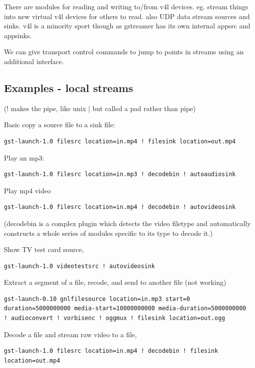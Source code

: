 \documentclass[oneside,english]{scrbook}
\begin{document}
There are modules for reading and writing to/from v4l devices. eg. stream things
into new virtual v4l devices for others to read. also UDP data stream
sources and sinks. v4l is a minority sport though as gstreamer has
its own internal appsrc and appsinks.

We can give transport control commands to jump to points in streams using an additional interface.

\subsection{Examples - local streams}

(\textquotedbl{}!\textquotedbl{} makes the pipe, like unix \textquotedbl{}|\textquotedbl{}
but called a \textquotedbl{}pad\textquotedbl{} rather than \textquotedbl{}pipe\textquotedbl{})

Basic copy a source file to a sink file: 

\begin{lstlisting}
gst-launch-1.0 filesrc location=in.mp4 ! filesink location=out.mp4
\end{lstlisting}

Play an mp3:

\begin{lstlisting}
gst-launch-1.0 filesrc location=in.mp3 ! decodebin ! autoaudiosink
\end{lstlisting}

Play mp4 video 
\begin{lstlisting}
gst-launch-1.0 filesrc location=in.mp4 ! decodebin ! autovideosink
\end{lstlisting}
(decodebin is a complex plugin which detects the video filetype and automatically constructs a whole series of modules specific to its type to decode it.)

Show TV test card source,
\begin{lstlisting}
gst-launch-1.0 videotestsrc ! autovideosink
\end{lstlisting}

Extract a segment of a file, recode, and send to another file (not
working) 

\begin{lstlisting}
gst-launch-0.10 gnlfilesource location=in.mp3 start=0
duration=5000000000 media-start=10000000000 media-duration=5000000000
! audioconvert ! vorbisenc ! oggmux ! filesink location=out.ogg
\end{lstlisting}

Decode a file and stream raw video to a file, 
\begin{lstlisting}
gst-launch-1.0 filesrc location=in.mp4 ! decodebin ! filesink location=out.mp4
\end{lstlisting}
\end{document}
